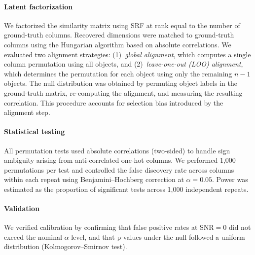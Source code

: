 \paragraph{Latent factorization}
We factorized the similarity matrix using SRF at rank equal to the number of ground-truth columns. Recovered dimensions were matched to ground-truth columns using the Hungarian algorithm based on absolute correlations. We evaluated two alignment strategies: (1)~\emph{global alignment}, which computes a single column permutation using all objects, and (2)~\emph{leave-one-out (LOO) alignment}, which determines the permutation for each object using only the remaining $n-1$ objects. The null distribution was obtained by permuting object labels in the ground-truth matrix, re-computing the alignment, and measuring the resulting correlation. This procedure accounts for selection bias introduced by the alignment step.

\paragraph{Statistical testing}
All permutation tests used absolute correlations (two-sided) to handle sign ambiguity arising from anti-correlated one-hot columns. We performed 1,000 permutations per test and controlled the false discovery rate across columns within each repeat using Benjamini--Hochberg correction at $\alpha = 0.05$. Power was estimated as the proportion of significant tests across 1,000 independent repeats.

\paragraph{Validation}
We verified calibration by confirming that false positive rates at SNR${}=0$ did not exceed the nominal $\alpha$ level, and that p-values under the null followed a uniform distribution (Kolmogorov--Smirnov test).
